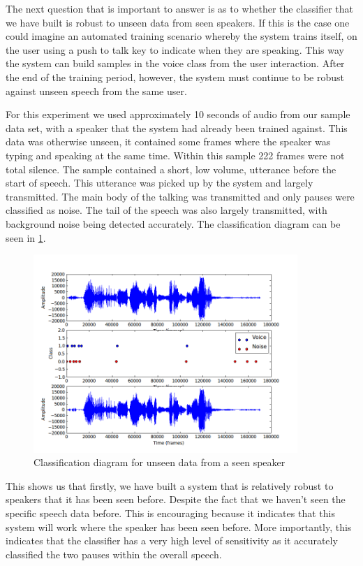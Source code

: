 \documentclass[ %
                    author={Sam Phippen},
                supervisor={Dr. Rafal Bogacz},
                     title={Real time voice activity detectors in noisy personal computing environments},
                  subtitle={},
                    degree={MEng},
                      year={2012} ]{thesis}
\begin{document}
The next question that is important to answer is as to whether the classifier
that we have built is robust to unseen data from seen speakers. If this is the
case one could imagine an automated training scenario whereby the system trains
itself, on the user using a push to talk key to indicate when they are
speaking. This way the system can build samples in the voice class from the
user interaction. After the end of the training period, however,
the system must continue to be robust against unseen speech from the same user.

For this experiment we used approximately 10 seconds of audio from our sample
data set, with a speaker that the system had already been trained against. This
data was otherwise unseen, it contained some frames where the speaker was
typing and speaking at the same time. Within this sample 222 frames were not
total silence. The sample contained a short, low volume, utterance before the
start of speech. This utterance was picked up by the system and largely
transmitted. The main body of the talking was transmitted and only pauses were
classified as noise. The tail of the speech was also largely transmitted, with
background noise being detected accurately. The classification diagram can be
seen in \ref{fig:ultimation}.

\begin{figure}
    \label{fig:ultimation}
    \includegraphics[width=10cm]{ultimation.png}
    \caption{Classification diagram for unseen data from a seen speaker}
\end{figure}

This shows us that firstly, we have built a system that is relatively robust to
speakers that it has been seen before. Despite the fact that we haven't seen
the specific speech data before. This is encouraging because it indicates that
this system will work where the speaker has been seen before. More importantly,
this indicates that the classifier has a very high level of sensitivity as it
accurately classified the two pauses within the overall speech.
\end{document}
